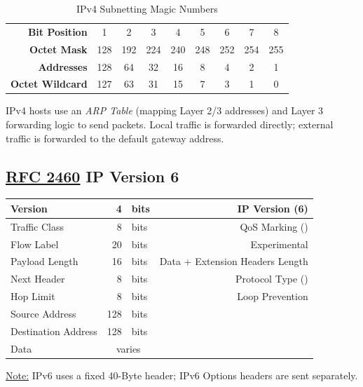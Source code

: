 \documentclass[12pt]{article}
\newif\ifcolor											%
\newcommand{\note}[1]{\ifcolor \colorbox{#1}{Note:}\else \underline{Note:}\fi}
\newcommand{\RFC}[1]{\href{https://datatracker.ietf.org/doc/html/rfc#1}{RFC #1}}
\newcommand{\mc}[3]{\multicolumn{#1}{#2}{#3}}
\begin{document}
	\begin{table}[H]
	\centering
	\caption{IPv4 Subnetting Magic Numbers \label{tab:SUBNETTING}}
	\begin{tabular}{@{} r | c c c c c c c c @{}}\hline
	\textbf{Bit Position}	& 1	& 2	& 3	& 4	& 5	& 6	& 7 & 8\\
	\textbf{Octet Mask}	& 128 & 192 & 224 & 240 & 248 & 252 & 254 & 255\\
	\textbf{Addresses}	& 128	& 64	& 32	& 16	& 8	& 4	& 2	& 1\\
	\textbf{Octet Wildcard}	& 127	& 63	& 31 	& 15	& 7	& 3	& 1	& 0\\\hline
	\end{tabular}\end{table}

	IPv4 hosts use an \textit{ARP Table} (mapping Layer 2/3 addresses) and Layer 3 forwarding logic to send packets. Local traffic is forwarded directly; external traffic is forwarded to the default gateway address.


	\subsection[RFC 2460 IPv6]{\RFC{2460} IP Version 6 \label{subsec:IPV6}}
	\begin{table}[H]
	\centering
	\begin{tabular}{| l | r @{ } l | r |}\hline
	Version			& 4		& bits	& IP Version (6)\\\hline
	Traffic Class			& 8		& bits	& QoS Marking (\Cref{sec:QOS})\\\hline
	Flow Label			& 20		& bits	& Experimental\\\hline
	Payload Length		& 16		& bits	& Data + Extension Headers Length\\\hline
	Next Header		& 8		& bits	& Protocol Type (\Cref{tab:L3 PROTOCOL})\\\hline
	Hop Limit			& 8		& bits	& Loop Prevention\\\hline
	Source Address		& 128		& bits	&\\\hline
	Destination Address	& 128		& bits	&\\\hline
	Data				& \mc{2}{c|}{varies}	&\\\hline
	\end{tabular}\end{table}
	\note{Goldenrod} IPv6 uses a fixed 40-Byte header; IPv6 Options headers are sent separately.
\end{document}
